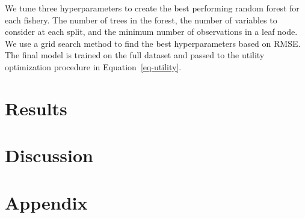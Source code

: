 \documentclass[
  letterpaper,
  DIV=11,
  numbers=noendperiod]{scrartcl}
\begin{document}
We tune three hyperparameters to create the best performing random
forest for each fishery. The number of trees in the forest, the number
of variables to consider at each split, and the minimum number of
observations in a leaf node. We use a grid search method to find the
best hyperparameters based on RMSE. The final model is trained on the
full dataset and passed to the utility optimization procedure in
Equation~\ref{eq-utility}.

\hypertarget{sec-results}{%
\section{Results}\label{sec-results}}

\hypertarget{sec-discussion}{%
\section{Discussion}\label{sec-discussion}}

\hypertarget{sec-appendix}{%
\section{Appendix}\label{sec-appendix}}

\begingroup\fontsize{7}{9}\selectfont
\end{document}
